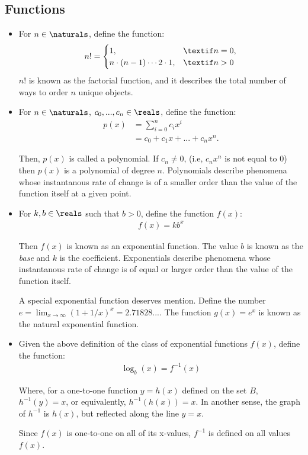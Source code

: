 \subsection{Functions}
\begin{itemize}
  \item For $n \in \naturals$, define the function:
  \begin{align}
    n! =
    \begin{cases}
      1, &\textif n = 0, \\
      n \cdot (n-1) \cdots 2 \cdot 1, &\textif n > 0
    \end{cases}
  \end{align}
  $n!$ is known as the factorial function, and it describes the total
  number of ways to order $n$ unique objects.

  \item For $n \in \naturals$, $c_0, ..., c_n \in \reals$, define the function:
  \begin{align}
    p(x) &= \sum_{i = 0}^{n} c_i x^i \\ 
         &= c_0 + c_1 x + ... + c_n x^n .
  \end{align}

  Then, $p(x)$ is called a polynomial. If $c_n \neq 0$, (i.e, $c_n x^n$ is not equal
  to $0$) then $p(x)$ is a polynomial of degree $n$. Polynomials describe phenomena
  whose instantanous rate of change is of a smaller order than the
  value of the function itself at a given point. 

  \item
  For $k, b \in \reals$ such that $b > 0$, define the function $f(x)$:
  \begin{align}
    f(x) = k b^x
  \end{align}

  Then $f(x)$ is known as an exponential function. The value $b$ is known as the
  \emph{base} and $k$ is the coefficient. Exponentials describe phenomena whose
  instantanous rate of change is of equal or larger order than the value of
  the function itself.

  A special exponential function deserves mention. Define the number
  $e = \lim_{x \to \infty} (1 + 1/x)^x = 2.71828...$. The function 
  $g(x) = e^x$ is known as the natural exponential function.

  \item
  Given the above definition of the class of exponential functions $f(x)$,
  define the function:
  \begin{align}
    \log_{b}(x) =  f^{-1}(x)
  \end{align}

  Where, for a one-to-one function $y = h(x)$ defined on the set $B$,
  $h^{-1}(y) = x$, or equivalently, $h^{-1}(h(x)) = x$. In another sense,
  the graph of $h^{-1}$ is $h(x)$, but reflected along the line $y=x$.

  Since $f(x)$ is one-to-one on all of its x-values, $f^{-1}$ is defined
  on all values $f(x)$.
\end{itemize}
